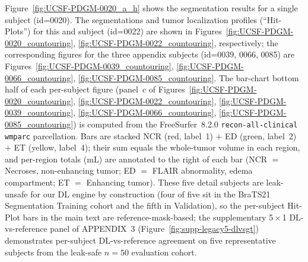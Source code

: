 \documentclass[a4paper,11pt,leqno]{article}
\begin{document}
Figure~\ref{fig:UCSF-PDGM-0020_a_h} shows the segmentation results for a single subject (id=0020).
The segmentations and tumor localization profiles (``Hit-Plots'') for this and subject (id=0022)
are shown in Figures~\ref{fig:UCSF-PDGM-0020_countouring}, \ref{fig:UCSF-PDGM-0022_countouring}, respectively;
the corresponding figures for the three appendix subjects (id=0039, 0066, 0085) are
Figures~\ref{fig:UCSF-PDGM-0039_countouring}, \ref{fig:UCSF-PDGM-0066_countouring}, \ref{fig:UCSF-PDGM-0085_countouring}.
The bar-chart bottom half of each per-subject figure (panel~c of Figures~\ref{fig:UCSF-PDGM-0020_countouring}, \ref{fig:UCSF-PDGM-0022_countouring}, \ref{fig:UCSF-PDGM-0039_countouring}, \ref{fig:UCSF-PDGM-0066_countouring}, \ref{fig:UCSF-PDGM-0085_countouring}) is computed from the FreeSurfer~8.2.0 \texttt{recon-all-clinical} \texttt{wmparc} parcellation. Bars are stacked NCR (red, label~1) $+$ ED (green, label~2) $+$ ET (yellow, label~4); their sum equals the whole-tumor volume in each region, and per-region totals (mL) are annotated to the right of each bar (NCR $=$ Necroses, non-enhancing tumor; ED $=$ FLAIR abnormality, edema compartment; ET $=$ Enhancing tumor). These five detail subjects are leak-unsafe for our DL engine by construction (four of five sit in the BraTS21 Segmentation Training cohort and the fifth in Validation), so the per-subject Hit-Plot bars in the main text are reference-mask-based; the supplementary 5\,$\times$\,1 DL-vs-reference panel of APPENDIX~3 (Figure~\ref{fig:supp-legacy5-dlvsgt}) demonstrates per-subject DL-vs-reference agreement on five representative subjects from the leak-safe $n=50$ evaluation cohort.
\end{document}

